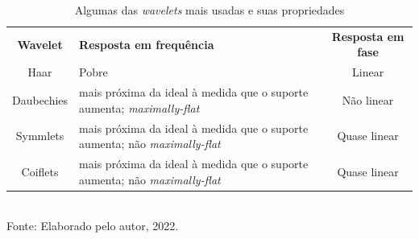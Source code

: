 \begin{table}[h]
	\centering
	\caption{Algumas das \textit{wavelets} mais usadas e suas propriedades}
	\begin{tabular}{@{}cY{75mm}c@{}}
			\tableHeaderRow \textbf{Wavelet} & \textbf{Resposta em frequência} & \textbf{Resposta em fase} \\
			Haar & Pobre &  Linear \\
			Daubechies & mais próxima da ideal à medida que o \newline  suporte aumenta; \textit{maximally-flat}  &  Não linear \\
			Symmlets & mais próxima da ideal à medida que o \newline  suporte aumenta; não \textit{maximally-flat}  & Quase linear \\
			Coiflets & mais próxima da ideal à medida que o \newline  suporte aumenta; não \textit{maximally-flat}  & Quase linear \\
			\bottomrule
	\end{tabular}
	\label{tab:waveletsProperties}
	\\Fonte: Elaborado pelo autor, 2022.
\end{table}
